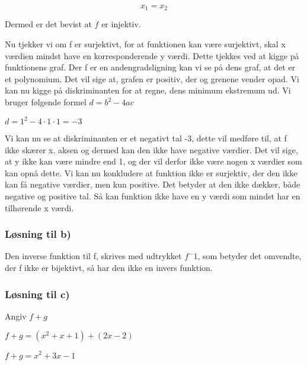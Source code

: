 \documentclass[12pt]{article}
\begin{document}
\[ x_1 = x_2 \]

Dermed er det bevist at \( f \) er injektiv.

Nu tjekker vi om f er surjektivt, for at funktionen kan være surjektivt, skal x værdien mindst have en korresponderende y værdi. Dette tjekkes ved at kigge på funktionens graf. Der f er en andengradsligning kan vi se på dens graf, at det er et polynomium. Det vil sige at, grafen er positiv, der og grenene vender opad. Vi kan nu kigge på diskriminanten for at regne, dens minimum ekstremum ud. Vi bruger følgende formel \begin{math} d=b^2-4ac\end{math}

\begin{math}d=1^2-4·1·1=-3\end{math}

Vi kan nu se at diskriminanten er et negativt tal -3, dette vil medføre til, at f ikke skærer x. aksen og dermed kan den ikke have negative værdier. Det vil sige, at y ikke kan være mindre end 1, og der vil derfor ikke være nogen x værdier som kan opnå dette. Vi kan nu konkludere at funktion ikke er surjektiv, der den ikke kan få negative værdier, men kun positive. Det betyder at den ikke dækker, både negative og positive tal. Så kan funktion ikke have en y værdi som mindst har en tilhørende x værdi. 

\subsubsection{Løsning til b)}

Den inverse funktion til f, skrives med udtrykket \begin{math} f^-1 \end{math}, som betyder det omvendte, der f ikke er bijektivt, så har den ikke en invers funktion. 




\subsubsection{Løsning til c)}
Angiv \begin{math}f + g \end{math}

\begin{math} f+g=(x^2 + x + 1) +(2x - 2) \end{math}


\begin{math} f+g=x^2+3x-1 \end{math}
\end{document}
